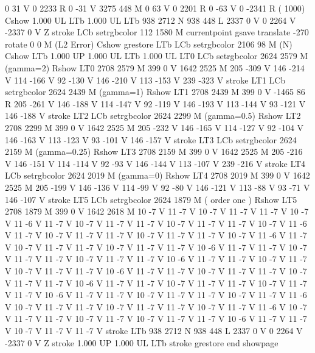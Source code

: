 0 31 V
0 2233 R
0 -31 V
3275 448 M
0 63 V
0 2201 R
0 -63 V
0 -2341 R
( 1000) Cshow
1.000 UL
LTb
1.000 UL
LTb
938 2712 N
938 448 L
2337 0 V
0 2264 V
-2337 0 V
Z stroke
LCb setrgbcolor
112 1580 M
currentpoint gsave translate -270 rotate 0 0 M
(L2 Error) Cshow
grestore
LTb
LCb setrgbcolor
2106 98 M
(N) Cshow
LTb
1.000 UP
1.000 UL
LTb
1.000 UL
LT0
LCb setrgbcolor
2624 2579 M
(gamma=2) Rshow
LT0
2708 2579 M
399 0 V
1642 2525 M
205 -309 V
146 -214 V
114 -166 V
92 -130 V
146 -210 V
113 -153 V
239 -323 V
stroke
LT1
LCb setrgbcolor
2624 2439 M
(gamma=1) Rshow
LT1
2708 2439 M
399 0 V
-1465 86 R
205 -261 V
146 -188 V
114 -147 V
92 -119 V
146 -193 V
113 -144 V
93 -121 V
146 -188 V
stroke
LT2
LCb setrgbcolor
2624 2299 M
(gamma=0.5) Rshow
LT2
2708 2299 M
399 0 V
1642 2525 M
205 -232 V
146 -165 V
114 -127 V
92 -104 V
146 -163 V
113 -123 V
93 -101 V
146 -157 V
stroke
LT3
LCb setrgbcolor
2624 2159 M
(gamma=0.25) Rshow
LT3
2708 2159 M
399 0 V
1642 2525 M
205 -216 V
146 -151 V
114 -114 V
92 -93 V
146 -144 V
113 -107 V
239 -216 V
stroke
LT4
LCb setrgbcolor
2624 2019 M
(gamma=0) Rshow
LT4
2708 2019 M
399 0 V
1642 2525 M
205 -199 V
146 -136 V
114 -99 V
92 -80 V
146 -121 V
113 -88 V
93 -71 V
146 -107 V
stroke
LT5
LCb setrgbcolor
2624 1879 M
( order one ) Rshow
LT5
2708 1879 M
399 0 V
1642 2618 M
10 -7 V
11 -7 V
10 -7 V
11 -7 V
11 -7 V
10 -7 V
11 -6 V
11 -7 V
10 -7 V
11 -7 V
11 -7 V
10 -7 V
11 -7 V
11 -7 V
10 -7 V
11 -6 V
11 -7 V
10 -7 V
11 -7 V
11 -7 V
10 -7 V
11 -7 V
11 -7 V
10 -7 V
11 -6 V
11 -7 V
10 -7 V
11 -7 V
11 -7 V
10 -7 V
11 -7 V
11 -7 V
10 -6 V
11 -7 V
11 -7 V
10 -7 V
11 -7 V
11 -7 V
10 -7 V
11 -7 V
11 -7 V
10 -6 V
11 -7 V
11 -7 V
10 -7 V
11 -7 V
10 -7 V
11 -7 V
11 -7 V
10 -6 V
11 -7 V
11 -7 V
10 -7 V
11 -7 V
11 -7 V
10 -7 V
11 -7 V
11 -7 V
10 -6 V
11 -7 V
11 -7 V
10 -7 V
11 -7 V
11 -7 V
10 -7 V
11 -7 V
11 -7 V
10 -6 V
11 -7 V
11 -7 V
10 -7 V
11 -7 V
11 -7 V
10 -7 V
11 -7 V
11 -6 V
10 -7 V
11 -7 V
11 -7 V
10 -7 V
11 -7 V
11 -7 V
10 -7 V
11 -7 V
11 -6 V
10 -7 V
11 -7 V
11 -7 V
10 -7 V
11 -7 V
10 -7 V
11 -7 V
11 -7 V
10 -6 V
11 -7 V
11 -7 V
10 -7 V
11 -7 V
11 -7 V
stroke
LTb
938 2712 N
938 448 L
2337 0 V
0 2264 V
-2337 0 V
Z stroke
1.000 UP
1.000 UL
LTb
stroke
grestore
end
showpage
